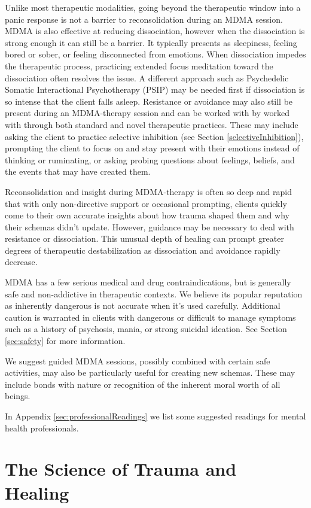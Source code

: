 \documentclass[12pt,letterpaper]{article}
\begin{document}
Unlike most therapeutic modalities, going beyond the therapeutic window into a panic response is not a barrier to reconsolidation during an MDMA session. MDMA is also effective at reducing dissociation, however when the dissociation is strong enough it can still be a barrier. It typically presents as sleepiness, feeling bored or sober, or feeling disconnected from emotions. When dissociation impedes the therapeutic process, practicing extended focus meditation toward the dissociation often resolves the issue. A different approach such as Psychedelic Somatic Interactional Psychotherapy (PSIP) may be needed first if dissociation is so intense that the client falls asleep. Resistance or avoidance may also still be present during an MDMA-therapy session and can be worked with by worked with through both standard and novel therapeutic practices. These may include asking the client to practice selective inhibition (see Section \ref{selectiveInhibition}), prompting the client to focus on and stay present with their emotions instead of thinking or ruminating, or asking probing questions about feelings, beliefs, and the events that may have created them.

Reconsolidation and insight during MDMA-therapy is often so deep and rapid that with only non-directive support or occasional prompting, clients quickly come to their own accurate insights about how trauma shaped them and why their schemas didn't update. However, guidance may be necessary to deal with resistance or dissociation. This unusual depth of healing can prompt greater degrees of therapeutic destabilization as dissociation and avoidance rapidly decrease.

MDMA has a few serious medical and drug contraindications, but is generally safe and non-addictive in therapeutic contexts. We believe its popular reputation as inherently dangerous is not accurate when it's used carefully. Additional caution is warranted in clients with dangerous or difficult to manage symptoms such as a history of psychosis, mania, or strong suicidal ideation. See Section \ref{sec:safety} for more information.

We suggest guided MDMA sessions, possibly combined with certain safe activities, may also be particularly useful for creating new schemas. These may include bonds with nature or recognition of the inherent moral worth of all beings.

In Appendix \ref{sec:professionalReadings} we list some suggested readings for mental health professionals.
\section{The Science of Trauma and Healing}
\end{document}
